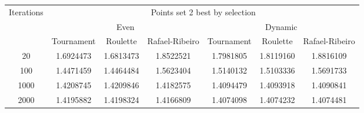 \begin{center}
	\begin{tabular}{|c|c|c|c|c|c|c|}
		\hline
		\multirow{3}{*}{Iterations}	&	\multicolumn{6}{c|}{Points set 2 best by selection}	\\
										\cline{2-7}
									&	\multicolumn{3}{c|}{Even}	& \multicolumn{3}{c|}{Dynamic} \\
										\cline{2-7}
									&	Tournament		&	Roulette		&	Rafael-Ribeiro	&	Tournament		&	Roulette		&	Rafael-Ribeiro		\\
		\hline
		20							&	1.6924473		&	1.6813473 \cellcolor[gray]{0.9}		&	1.8522521		&	1.7981805 \cellcolor[gray]{0.9}		&	1.8119160		&	1.8816109			\\
		\hline
		100							&	1.4471459		&	1.4464484 \cellcolor[gray]{0.9}		&	1.5623404		&	1.5140132		&	1.5103336 \cellcolor[gray]{0.9}		&	1.5691733			\\
		\hline
		1000						&	1.4208745		&	1.4209846		&	1.4182575 \cellcolor[gray]{0.9}		&	1.4094479		&	1.4093918		&	1.4090841 \cellcolor[gray]{0.9}			\\
		\hline	
		2000						&	1.4195882		&	1.4198324		&	1.4166809 \cellcolor[gray]{0.9}		&	1.4074098 \cellcolor[gray]{0.9}		&	1.4074232		&	1.4074481			\\
		\hline
	\end{tabular}
	\label{tab:selection_type_2}
\end{center}
